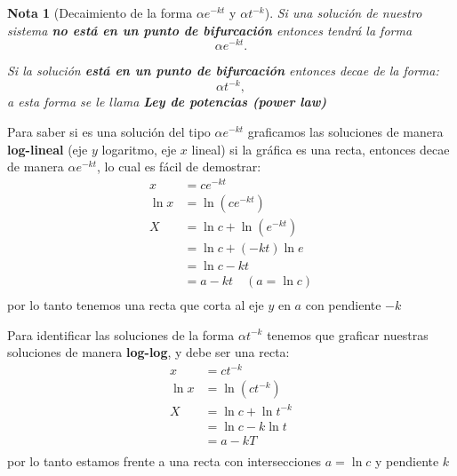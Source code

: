 \documentclass[12pt,letterpaper]{article}
\newtheorem{nota}{Nota}
\begin{document}
\begin{enumerate}
    \begin{tcolorbox}[colback=Orchid!5,colframe=Orchid] 
    \begin{nota}[Decaimiento de la forma $\alpha e^{-kt}$ y $\alpha t^{-k}$]
      Si una solución de nuestro sistema \textbf{no está en un punto de bifurcación} entonces tendrá la forma $$\alpha e^{-kt}.$$

      Si la solución \textbf{está en un punto de bifurcación} entonces decae de la forma: $$
      \alpha t^{-k},
      $$      
      a esta forma se le llama \textbf{Ley de potencias (power law)}      
    \end{nota}
    \end{tcolorbox}

    \begin{tcolorbox}[colback=YellowGreen!10, colframe=YellowGreen, title=¿Como diferenciar las curvas $\alpha e^{-et}$ y $\alpha t^{-a}$?]

      Para saber si es una solución del tipo $\alpha e^{-kt}$ graficamos las soluciones de manera \textbf{log-lineal} (eje $y$ logaritmo, eje $x$ lineal) si la gráfica es una recta, entonces decae de manera $\alpha e^{-kt}$, lo cual es fácil de demostrar:
      $$
      \begin{aligned}
        x &= ce^{-kt} \\
	\ln x &= \ln(ce^{-kt}) \\
	X &= \ln c+\ln(e^{-kt}) \\
	&= \ln c +(-kt)\ln e\\
	&= \ln c - kt \\
	&= a-kt \quad (a=\ln c) \\
      \end{aligned}
      $$
      por lo tanto tenemos una recta que corta al eje $y$ en $a$ con pendiente $-k$
      
      Para identificar las soluciones de la forma $\alpha t^{-k}$ tenemos que graficar nuestras soluciones de manera \textbf{log-log}, y debe ser una recta:
      $$
      \begin{aligned}
        x &= ct^{-k} \\
	\ln x &= \ln(ct^{-k}) \\
	X &= \ln c + \ln t^{-k} \\
	&= \ln c - k\ln t \\
	&= a - kT \\
      \end{aligned}
      $$
      por lo tanto estamos frente a una recta con intersecciones $a=\ln c$ y pendiente $k$ 
    \end{tcolorbox}


\end{enumerate}
\end{document}
